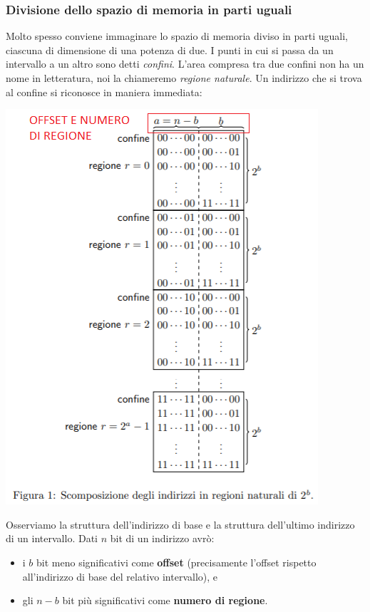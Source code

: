 \subsubsection{Divisione dello spazio di memoria in parti uguali}
Molto spesso conviene immaginare lo spazio di memoria diviso in parti uguali, ciascuna di dimensione di una potenza di due. 
I punti in cui si passa da un intervallo a un altro sono detti \emph{confini}. L'area compresa tra due confini non ha un nome in letteratura, noi la chiameremo \emph{regione naturale}.
Un indirizzo che si trova al confine si riconosce in maniera immediata:
\begin{center}
	\includegraphics{img/6.PNG}
\end{center}
Osserviamo la struttura dell'indirizzo di base e la struttura dell'ultimo indirizzo di un intervallo. Dati $n$ bit di un indirizzo avrò:
\begin{itemize}
	\item i $b$ bit meno significativi come \textbf{offset} (precisamente l'offset rispetto all'indirizzo di base del relativo intervallo), e
	\item gli $n-b$ bit più significativi come \textbf{numero di regione}.
\end{itemize}
